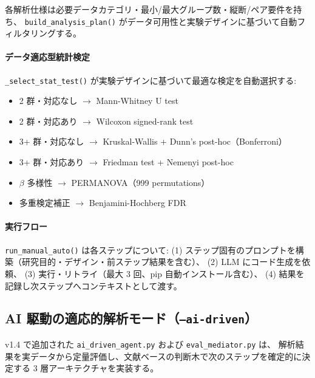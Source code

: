\documentclass[12pt, a4paper]{article}
\begin{document}
各解析仕様は必要データカテゴリ・最小/最大グループ数・縦断/ペア要件を持ち、
\texttt{build\_analysis\_plan()} がデータ可用性と実験デザインに基づいて自動フィルタリングする。

\paragraph{データ適応型統計検定}
\texttt{\_select\_stat\_test()} が実験デザインに基づいて最適な検定を自動選択する:
\begin{itemize}[nosep]
  \item 2 群・対応なし $\to$ Mann-Whitney U test
  \item 2 群・対応あり $\to$ Wilcoxon signed-rank test
  \item 3+ 群・対応なし $\to$ Kruskal-Wallis + Dunn's post-hoc（Bonferroni）
  \item 3+ 群・対応あり $\to$ Friedman test + Nemenyi post-hoc
  \item $\beta$ 多様性 $\to$ PERMANOVA（999 permutations）
  \item 多重検定補正 $\to$ Benjamini-Hochberg FDR
\end{itemize}

\paragraph{実行フロー}
\texttt{run\_manual\_auto()} は各ステップについて:
(1) ステップ固有のプロンプトを構築（研究目的・デザイン・前ステップ結果を含む）、
(2) LLM にコード生成を依頼、
(3) 実行・リトライ（最大 3 回、pip 自動インストール含む）、
(4) 結果を記録し次ステップへコンテキストとして渡す。

\subsection{AI 駆動の適応的解析モード（\texttt{--ai-driven}）}

v1.4 で追加された \texttt{ai\_driven\_agent.py} および \texttt{eval\_mediator.py} は、
解析結果を実データから定量評価し、文献ベースの判断木で次のステップを確定的に決定する
3 層アーキテクチャを実装する。
\end{document}
